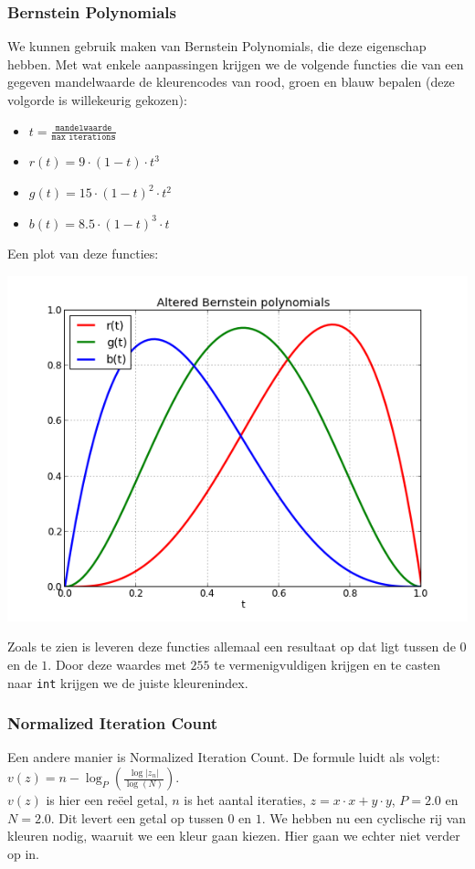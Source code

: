 \documentclass[hidelinks, dutch]{article}
\begin{document}
\subsubsection{Bernstein Polynomials}
We kunnen gebruik maken van Bernstein Polynomials, die deze eigenschap hebben. Met wat enkele aanpassingen krijgen we de volgende functies die van een gegeven mandelwaarde de kleurencodes van rood, groen en blauw bepalen (deze volgorde is willekeurig gekozen):
\begin{itemize}
	\item $t=\frac{\texttt{mandelwaarde}}{\texttt{max iterations}}$
	\item $r(t)=9\cdot (1-t)\cdot t^3$
	\item $g(t)=15\cdot (1-t)^2\cdot t^2$
	\item $b(t)=8.5\cdot (1-t)^3\cdot t$
\end{itemize}
Een plot van deze functies:
\begin{center}
		\includegraphics[scale=0.3]{img/rgb_smooth}
\end{center}
Zoals te zien is leveren deze functies allemaal een resultaat op dat ligt tussen de $0$ en de $1$. Door deze waardes met $255$ te vermenigvuldigen krijgen en te casten naar \texttt{int} krijgen we de juiste kleurenindex.

\subsubsection{Normalized Iteration Count}
Een andere manier is Normalized Iteration Count. De formule luidt als volgt: $v(z)=n-\log_P(\frac{\log|z_n|}{\log(N)})$.\\
$v(z)$ is hier een reëel getal, $n$ is het aantal iteraties, $z=x\cdot x+y\cdot y$, $P=2.0$ en $N=2.0$. Dit levert een getal op tussen $0$ en $1$. We hebben nu een cyclische rij van kleuren nodig, waaruit we een kleur gaan kiezen. Hier gaan we echter niet verder op in.
\end{document}
